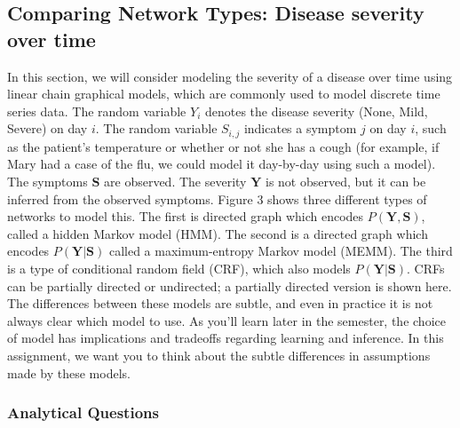 \documentclass[12pt]{article}
\begin{document}
\subsection{Comparing Network Types: Disease severity over time}
In this section, we will consider modeling the severity of a disease over time using linear chain graphical models, which are commonly used to model discrete time series data.
The random variable $Y_i$ denotes the disease severity (None, Mild, Severe) on day $i$. The random variable $S_{i,j}$ indicates a symptom $j$ on day $i$, such as the patient’s temperature or whether or not she has a cough (for example, if Mary had a case of the flu, we could model it day-by-day using such a model). The symptoms $\mathbf{S}$ are observed. The severity $\mathbf{Y}$ is not observed, but it can be inferred from the observed symptoms.
Figure 3 shows three different types of networks to model this. The first is directed graph which encodes $P(\mathbf{Y}, \mathbf{S})$, called a hidden Markov model (HMM). The second is a directed graph which encodes $P(\mathbf{Y}|\mathbf{S})$ called a maximum-entropy Markov model (MEMM). The third is a type of conditional random field (CRF), which also models $P(\mathbf{Y}|\mathbf{S})$. CRFs can be partially directed or undirected; a partially directed version is shown here.
The differences between these models are subtle, and even in practice it is not always clear which model to use. As you’ll learn later in the semester, the choice of model has implications and tradeoffs regarding learning and inference. In this assignment, we want you to think about the subtle differences in assumptions made by these models.
\subsubsection{Analytical Questions}
\end{document}
